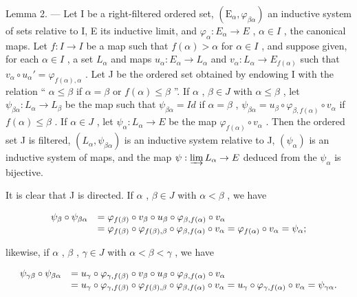 Lemma 2. --- Let I be a right-filtered ordered set, \((\mathrm{E}_{\alpha}, \varphi_{\beta\alpha})\) an inductive system of sets relative to I, E its inductive limit, and \(\varphi_{\alpha}: E_{\alpha} \to E\) , \(\alpha \in I\) , the canonical maps. Let \(f: I \to I\) be a map such that \(f(\alpha) > \alpha\) for \(\alpha \in I\) , and suppose given, for each \(\alpha \in I\) , a set \(L_{\alpha}\) and maps \(u_{\alpha}: E_{\alpha} \to L_{\alpha}\) and \(v_{\alpha}: L_{\alpha} \to E_{f(\alpha)}\) such that \(v_{\alpha} \circ u_{\alpha}' = \varphi_{f(\alpha),\alpha}\) . Let J be the ordered set obtained by endowing I with the relation “ \(\alpha \leqslant \beta\) if \(\alpha = \beta\) or \(f(\alpha) \leqslant \beta\) ”. If \(\alpha\) , \(\beta \in J\) with \(\alpha \leqslant \beta\) , let \(\psi_{\beta\alpha}: L_{\alpha} \to L_{\beta}\) be the map such that \(\psi_{\beta\alpha} = Id\) if \(\alpha = \beta\) , \(\psi_{\beta\alpha} = u_{\beta} \circ \varphi_{\beta,f(\alpha)} \circ v_{\alpha}\) if \(f(\alpha) \leqslant \beta\) . If \(\alpha \in J\) , let \(\psi_{\alpha}: L_{\alpha} \to E\) be the map \(\varphi_{f(\alpha)} \circ v_{\alpha}\) . Then the ordered set J is filtered, \((L_{\alpha}, \psi_{\beta\alpha})\) is an inductive system relative to J, \((\psi_{\alpha})\) is an inductive system of maps, and the map \(\psi: \varinjlim L_{\alpha} \to E\) deduced from the \(\psi_{\alpha}\) is bijective.

It is clear that J is directed. If \(\alpha\) , \(\beta \in J\) with \(\alpha < \beta\) , we have

\[
\begin{array}{r l} \psi_ {\beta} \circ \psi_ {\beta \alpha} & = \varphi_ {f (\beta)} \circ v _ {\beta} \circ u _ {\beta} \circ \varphi_ {\beta , f (\alpha)} \circ v _ {\alpha} \\ & = \varphi_ {f (\beta)} \circ \varphi_ {f (\beta), \beta} \circ \varphi_ {\beta , f (\alpha)} \circ v _ {\alpha} = \varphi_ {f (\alpha)} \circ v _ {\alpha} = \psi_ {\alpha}; \end{array}
\]

likewise, if \(\alpha\) , \(\beta\) , \(\gamma \in J\) with \(\alpha < \beta < \gamma\) , we have

\[
\begin{array}{r l} \psi_ {\gamma \beta} \circ \psi_ {\beta \alpha} & = u _ {\gamma} \circ \varphi_ {\gamma , f (\beta)} \circ v _ {\beta} \circ u _ {\beta} \circ \varphi_ {\beta , f (\alpha)} \circ v _ {\alpha} \\ & = u _ {\gamma} \circ \varphi_ {\gamma , f (\beta)} \circ \varphi_ {f (\beta), \beta} \circ \varphi_ {\beta , f (\alpha)} \circ v _ {\alpha} = u _ {\gamma} \circ \varphi_ {\gamma , f (\alpha)} \circ v _ {\alpha} = \psi_ {\gamma \alpha}. \end{array}
\]

